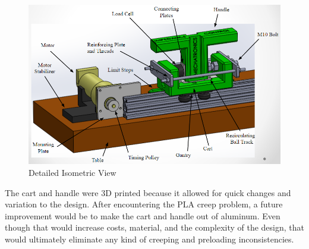 \begin{figure}
\centering
\includegraphics[width=1\linewidth]{Images/Annotated_Iso}
\caption{Detailed Isometric View}
\label{fig:Annotated_Iso}
\end{figure}

The cart and handle were 3D printed because it allowed for quick changes and variation to the design. After encountering the PLA creep problem, a future improvement would be to make the cart and handle out of aluminum. Even though that would increase costs, material, and the complexity of the design, that would ultimately eliminate any kind of creeping and preloading inconsistencies. 